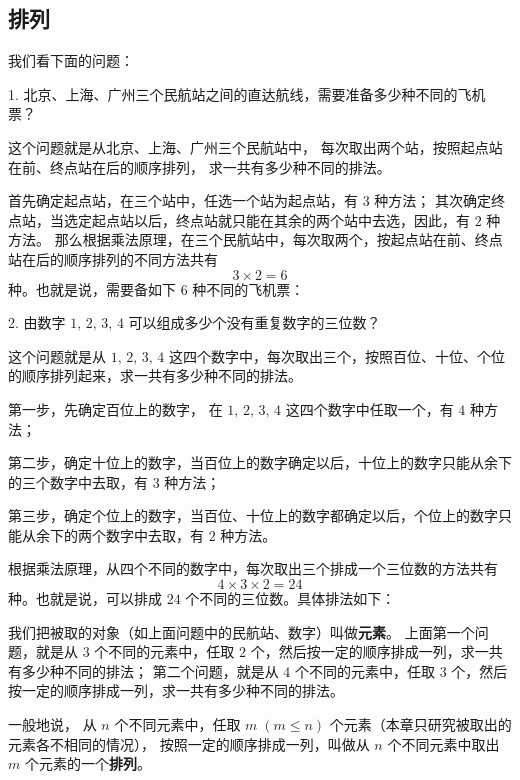 \subsection{排列}\label{subsec:2-2}

我们看下面的问题：

1. 北京、上海、广州三个民航站之间的直达航线，需要准备多少种不同的飞机票？

这个问题就是从北京、上海、广州三个民航站中， 每次取出两个站，按照起点站在前、终点站在后的顺序排列，
求一共有多少种不同的排法。

首先确定起点站，在三个站中，任选一个站为起点站，有 $3$ 种方法；
其次确定终点站，当选定起点站以后，终点站就只能在其余的两个站中去选，因此，有 $2$ 种方法。
那么根据乘法原理，在三个民航站中，每次取两个，按起点站在前、终点站在后的顺序排列的不同方法共有
$$ 3 \times 2 = 6 $$
种。也就是说，需要备如下 $6$ 种不同的飞机票：

\begin{figure}[htbp]
    \centering
    
\end{figure}


2. 由数字 $1,\, 2,\, 3,\, 4$ 可以组成多少个没有重复数字的三位数？

这个问题就是从 $1,\, 2,\, 3,\, 4$ 这四个数字中，每次取出三个，按照百位、十位、个位的顺序排列起来，求一共有多少种不同的排法。

第一步，先确定百位上的数字， 在 $1,\, 2,\, 3,\, 4$ 这四个数字中任取一个，有 $4$ 种方法；

第二步，确定十位上的数字，当百位上的数字确定以后，十位上的数字只能从余下的三个数字中去取，有 $3$ 种方法；

第三步，确定个位上的数字，当百位、十位上的数字都确定以后，个位上的数字只能从余下的两个数字中去取，有 $2$ 种方法。

根据乘法原理，从四个不同的数字中，每次取出三个排成一个三位数的方法共有
$$ 4 \times 3 \times 2 = 24 $$
种。也就是说，可以排成 $24$ 个不同的三位数。具体排法如下：

\begin{figure}[htbp]
    \centering
    
\end{figure}

我们把被取的对象（如上面问题中的民航站、数字）叫做\textbf{元素}。
上面第一个问题，就是从 $3$ 个不同的元素中，任取 $2$ 个，然后按一定的顺序排成一列，求一共有多少种不同的排法；
    第二个问题，就是从 $4$ 个不同的元素中，任取 $3$ 个，然后按一定的顺序排成一列，求一共有多少种不同的排法。

一般地说， 从 $n$ 个不同元素中，任取 $m \; (m \leqslant n)$ 个元素（本章只研究被取出的元素各不相同的情况），
按照一定的顺序排成一列，叫做从 $n$ 个不同元素中取出 $m$ 个元素的一个\textbf{排列}。

